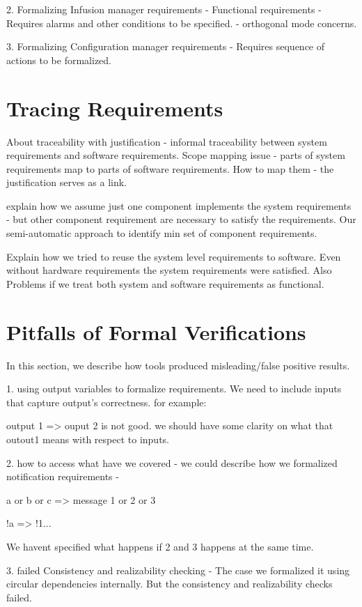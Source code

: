 \documentclass{llncs}
\begin{document}
2. Formalizing Infusion manager requirements - Functional requirements - Requires alarms and other conditions to be specified. - orthogonal mode concerns.

\vspace{2mm}
3. Formalizing Configuration manager requirements - Requires sequence of actions to be formalized.

\section{Tracing Requirements}

About traceability with justification - informal traceability between system requirements and software requirements. Scope mapping issue - parts of system requirements map to parts of software requirements. How to map them - the justification serves as a link.

\vspace{2mm}

explain how we assume just one component implements the system requirements - but other component requirement are necessary to satisfy the requirements. Our semi-automatic approach to identify min set of component requirements.

\vspace{2mm}

Explain how we tried to reuse the system level requirements to software. Even without hardware requirements the system requirements were satisfied. Also Problems if we treat both system and software requirements as functional.

\section{Pitfalls of Formal Verifications}

In this section, we describe how tools produced misleading/false positive results.

\vspace{2mm}
1. using output variables to formalize requirements. We need to include inputs that capture output's correctness. for example:

output 1 => ouput 2
is not good. we should have some clarity on what that outout1 means with respect to inputs.

\vspace{2mm}

2. how to access what have we covered - we could describe how we formalized notification requirements -

a or b or c => message 1 or 2 or 3

!a => !1...

We havent specified what happens if 2 and 3 happens at the same time.

\vspace{2mm}
3. failed Consistency and realizability checking - The case we formalized it using circular dependencies internally. But the consistency and realizability checks failed.
\fi



\end{document}
